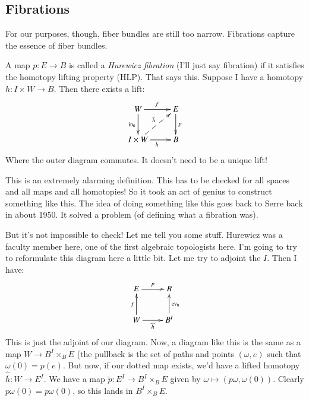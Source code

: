 \subsection{Fibrations}
For our purposes, though, fiber bundles are still too narrow.
Fibrations capture the essence of fiber bundles.
\begin{definition}
    A map $p:E\to B$ is called a \emph{Hurewicz fibration} (I'll just say fibration) if it satisfies the homotopy lifting property (HLP). That says this. Suppose I have a homotopy $h:I\times W\to B$. Then there exists a lift:
    \begin{equation*}
	\xymatrix{
	    W\ar[r]^f\ar[d]_{\mathrm{in}_0} & E\ar[d]^p\\
	    I\times W\ar[r]_h\ar@{-->}[ur]^{\overline{h}} & B
	    }
    \end{equation*}
    Where the outer diagram commutes. It doesn't need to be a unique lift!
\end{definition}
This is an extremely alarming definition. This has to be checked for all spaces and all maps and all homotopies! So it took an act of genius to construct something like this. The idea of doing something like this goes back to Serre back in about 1950. It solved a problem (of defining what a fibration was).

But it's not impossible to check! Let me tell you some stuff. Hurewicz was a faculty member here, one of the first algebraic topologists here. I'm going to try to reformulate this diagram here a little bit. Let me try to adjoint the $I$. Then I have:
\begin{equation*}
    \xymatrix{
	E\ar[r]^p & B\\
	W\ar[u]^f\ar[r]_{\widehat{h}} & B^I\ar[u]_{\mathrm{ev}_0}
    }
\end{equation*}
This is just the adjoint of our diagram. Now, a diagram like this is the same as a map $W\to B^I\times_B E$ (the pullback is the set of paths and points $(\omega, e)$ such that $\omega(0) = p(e)$. But now, if our dotted map exists, we'd have a lifted homotopy $\widehat{\overline{h}}:W\to E^I$. We have a map $\widetilde{p}:E^I\to B^I\times_B E$ given by $\omega\mapsto (p\omega,\omega(0))$. Clearly $p\omega(0) = p\omega(0)$, so this lands in $B^I\times_B E$.

